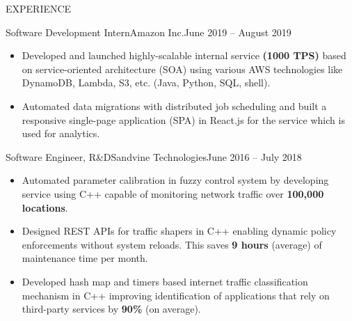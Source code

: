 \documentclass[]{mcdowellcv}
\begin{document}
	\begin{cvsection}{EXPERIENCE}
	\begin{cvsubsection}{Software Development Intern}{Amazon Inc.}{June 2019 -- August 2019}
			\begin{itemize}
				\item Developed and launched highly-scalable internal service \textbf{(1000 TPS)} based on service-oriented architecture (SOA) using various AWS technologies like DynamoDB, Lambda, S3, etc. (Java, Python, SQL, shell).
				\item Automated data migrations with distributed job scheduling and built a responsive single-page application (SPA) in React.js for the service which is used for analytics.
			\end{itemize}
		\end{cvsubsection}
		
		\begin{cvsubsection}{Software Engineer, R\&D}{Sandvine Technologies}{June 2016 -- July 2018}
			\begin{itemize}
				\item Automated parameter calibration in fuzzy control system by developing service using C++ capable of monitoring network traffic over \textbf{100,000 locations}.
				\item Designed REST APIs for traffic shapers in C++ enabling dynamic policy enforcements without system reloads. This saves \textbf{9 hours} (average) of maintenance time per month.
				\item Developed hash map and timers based internet traffic classification mechanism in C++ improving identification of applications that rely on third-party services by \textbf{90\%} (on average).
			\end{itemize}
		\end{cvsubsection}
	\end{cvsection}
	
\end{document}
